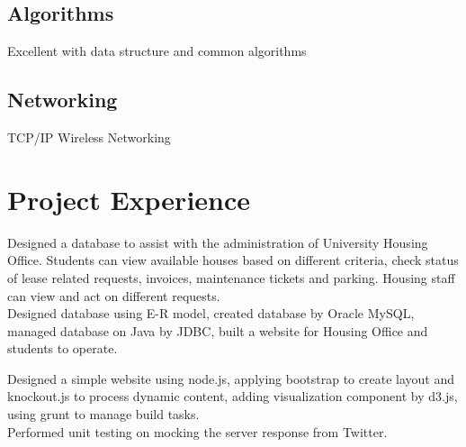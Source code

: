 \documentclass[]{Hsb_resume}
\begin{document}
\begin{minipage}[t]{0.33\textwidth}
\subsection{Algorithms}
Excellent with data structure and common algorithms
\vspace{8pt}
\subsection{Networking}
TCP/IP \textbullet{} Wireless Networking
\sectionsep

%
%

\end{minipage} 
\hfill
\begin{minipage}[t]{0.66\textwidth} 


\section{Project Experience}
\textbullet{ } Designed a database to assist with the administration of University Housing Office. Students can view available houses based on different criteria, check status of lease related requests, invoices, maintenance tickets and parking. Housing staff can view and act on different requests. \\
\textbullet{ } Designed database using E-R model, created database by Oracle MySQL, managed database on Java by JDBC, built a website for Housing Office and students to operate.
\sectionsep

\textbullet{ } Designed a simple website using node.js, applying bootstrap to create layout and knockout.js to process dynamic content, adding visualization component by d3.js, using grunt to manage build tasks. \\
\textbullet{ } Performed unit testing on mocking the server response from Twitter.
\sectionsep


\end{minipage}
\end{document}

